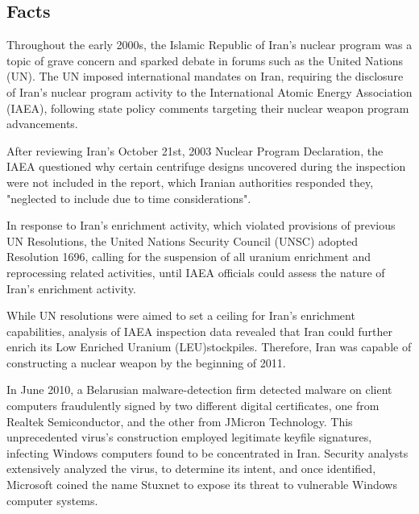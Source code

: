 \documentclass[12pt]{article}
\begin{document}
\begin{multicols}{2}

\section{Facts}

Throughout the early 2000s, the Islamic Republic of Iran's nuclear program was a topic of grave concern and sparked debate in forums such as the United Nations (UN).\cite{unitedNationsResolutions} The UN imposed international mandates on Iran, requiring the disclosure of Iran's nuclear program activity to the International Atomic Energy Association (IAEA), following state policy comments targeting their nuclear weapon program advancements. 

After reviewing Iran's October 21st, 2003 Nuclear Program Declaration, the IAEA questioned why certain centrifuge designs uncovered during the inspection were not included in the report, which Iranian authorities responded they, "neglected to include due to time considerations".\cite{implementationOfNPTSafeguards}

In response to Iran's enrichment activity, which violated provisions of previous UN Resolutions, the United Nations Security Council (UNSC) adopted Resolution 1696, calling for the suspension of all uranium enrichment and reprocessing related activities, until IAEA officials could assess the nature of Iran's enrichment activity.\cite{resolution1696}

While UN resolutions were aimed to set a ceiling for Iran's enrichment capabilities, analysis of IAEA inspection data revealed that Iran could further enrich its Low Enriched Uranium (LEU)\footnotemark[1] stockpiles.  Therefore, Iran was capable of constructing a nuclear weapon by the beginning of 2011.\cite{hasIranAchievedaNuclearWeapon}


In June 2010, a Belarusian malware-detection firm detected malware on client computers fraudulently signed by two different digital certificates, one from Realtek Semiconductor, and the other from JMicron Technology.\cite{theRealStoryOfStuxnet} This unprecedented virus's construction employed legitimate keyfile signatures, infecting Windows computers found to be concentrated in Iran.\cite{w32.stuxnetDossier} Security analysts extensively analyzed the virus, to determine its intent, and once identified, Microsoft coined the name Stuxnet to expose its threat to vulnerable Windows computer systems.\cite{microsoftCoinsStuxnet}


\end{multicols}
\end{document}
